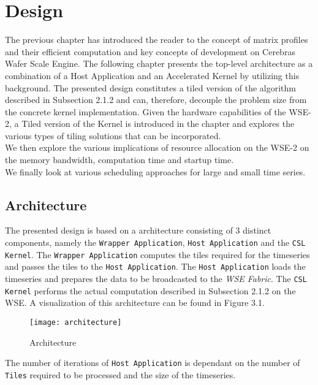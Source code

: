 \chapter{Design}\label{chapter:design}

The previous chapter has introduced the reader to the concept of matrix profiles and
their efficient computation and key concepts of development on Cerebras Wafer Scale Engine. The following chapter presents the top-level architecture as a combination
of a Host Application and an Accelerated Kernel by utilizing this background.
The presented design constitutes a tiled version of the algorithm described in
Subsection 2.1.2 and can, therefore, decouple the problem size from the concrete kernel
implementation. Given the hardware capabilities of the WSE-2, a Tiled version of the Kernel is introduced in the chapter and explores the various types of tiling solutions that can be incorporated.\\

We then explore the various implications of resource allocation on the WSE-2 on the memory bandwidth, computation time and startup time.\\

We finally look at various scheduling approaches for large and small time series.

\section{Architecture}

The presented design is based on a architecture consisting of 3 distinct components, namely the \texttt{Wrapper Application}, \texttt{Host Application} and the \texttt{CSL Kernel}. The \texttt{Wrapper Application} computes the tiles required for the timeseries and passes the tiles to the \texttt{Host Application}. The \texttt{Host Application} loads the timeseries and prepares the data to be broadcasted to the \textit{WSE Fabric}. The \texttt{CSL Kernel} performs the actual computation described in Subsection 2.1.2 on the WSE. A visualization of this architecture can be found in Figure 3.1.

\clearpage
\begin{figure}[h!]
    \texttt{[image: architecture]}
    \centering
    \caption{Architecture}
\end{figure}

The number of iterations of \texttt{Host Application} is dependant on the number of \texttt{Tiles} required to be processed and the size of the timeseries.

